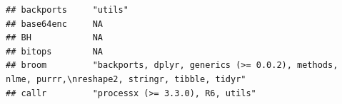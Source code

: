 \documentclass[]{article}
\begin{document}
\begin{verbatim}
## backports     "utils"                                                                                                                                                                                                                                                                                                                                                                                                                                                                               
## base64enc     NA                                                                                                                                                                                                                                                                                                                                                                                                                                                                                    
## BH            NA                                                                                                                                                                                                                                                                                                                                                                                                                                                                                    
## bitops        NA                                                                                                                                                                                                                                                                                                                                                                                                                                                                                    
## broom         "backports, dplyr, generics (>= 0.0.2), methods, nlme, purrr,\nreshape2, stringr, tibble, tidyr"                                                                                                                                                                                                                                                                                                                                                                                      
## callr         "processx (>= 3.3.0), R6, utils"                                                                                                                                                                                                                                                                                                                                                                                                                                                      

\end{verbatim}
\end{document}
